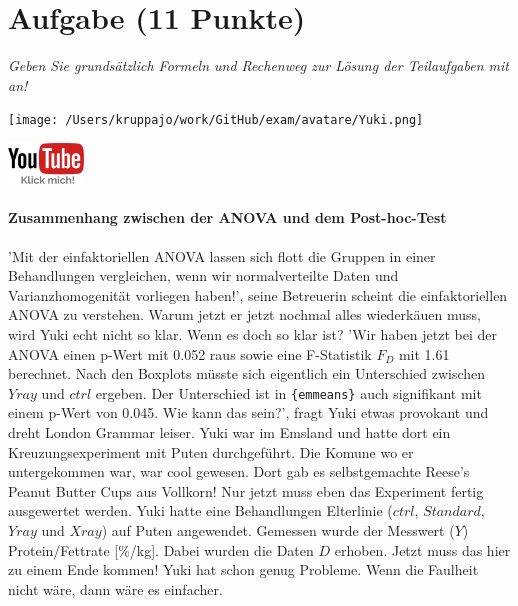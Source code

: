 \documentclass[a4paper, 9pt]{scrartcl}\usepackage[]{graphicx}\usepackage[]{xcolor}
\begin{document}
 
\clearpage

\section{Aufgabe \hfill (11 Punkte)}

\textit{Geben Sie grundsätzlich Formeln und Rechenweg zur Lösung der Teilaufgaben mit an!} \\[1Ex]
 

 
\begin{minipage}[t]{0.5\textwidth}
\texttt{[image: /Users/kruppajo/work/GitHub/exam/avatare/Yuki.png]}
\end{minipage}
\begin{minipage}[t]{0.5\textwidth}
\hfill
\href{https://youtu.be/M9Uhm67ndxM}{\includegraphics[width = 2cm]{img/youtube}}
\end{minipage}
\vspace{-3Ex}



\paragraph{Zusammenhang zwischen der ANOVA und dem Post-hoc-Test}

'Mit der einfaktoriellen ANOVA lassen sich flott die Gruppen in einer Behandlungen vergleichen, wenn wir normalverteilte Daten und Varianzhomogenität vorliegen haben!', seine Betreuerin scheint die einfaktoriellen ANOVA zu verstehen. Warum jetzt er jetzt nochmal alles wiederkäuen muss, wird Yuki echt nicht so klar. Wenn es doch so klar ist? 'Wir haben jetzt bei der ANOVA einen p-Wert mit 0.052 raus sowie eine F-Statistik $F_D$ mit 1.61 berechnet. Nach den Boxplots müsste sich eigentlich ein Unterschied zwischen $Yray$ und $ctrl$ ergeben. Der Unterschied ist in \texttt{\{emmeans\}} auch signifikant mit einem p-Wert von 0.045. Wie kann das sein?', fragt Yuki etwas provokant und dreht London Grammar leiser. Yuki war im Emsland und hatte dort ein Kreuzungsexperiment mit Puten durchgeführt. Die Komune wo er untergekommen war, war cool gewesen. Dort gab es selbstgemachte Reese's Peanut Butter Cups aus Vollkorn! Nur jetzt muss eben das Experiment fertig ausgewertet werden. Yuki hatte eine Behandlungen Elterlinie ($ctrl$, $Standard$, $Yray$ und $Xray$) auf Puten angewendet. Gemessen wurde der Messwert ($Y$) Protein/Fettrate [\%/kg]. Dabei wurden die Daten $D$ erhoben. Jetzt muss das hier zu einem Ende kommen! Yuki hat schon genug Probleme. Wenn die Faulheit nicht wäre, dann wäre es einfacher.
\end{document}
